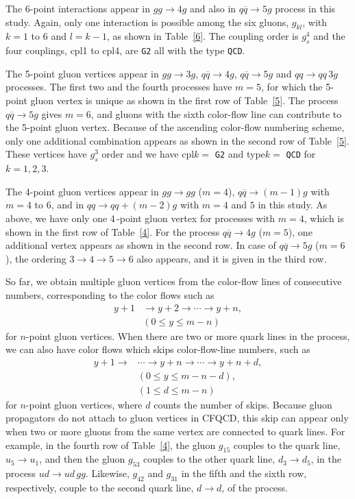 \documentclass[a4paper,11pt]{article}
\begin{document}
The 6-point interactions appear in $gg\rightarrow 4g$ and also in
$q\overline{q}\rightarrow 5g$ process in this study. Again, only one
interaction is possible among the six gluons, $g_{kl}$, with $k=1$ to
$6$ and $l=k-1$, as shown in Table~\ref{6}. The coupling order is
$g_s^4$ and the four couplings, cpl1 to cpl4, are {\tt G2} all with the type
{\tt QCD}.

The 5-point gluon vertices appear in $gg\rightarrow 3g$,
$q\overline{q}\rightarrow 4g$, $q\overline{q}\rightarrow 5g$ and $qq\rightarrow
qq\,3g$ processes. The first two and the fourth processes have $m=5$, for which
the 5-point gluon vertex is unique as shown in the first row of
Table~\ref{5}. The process $q\overline{q}\rightarrow 5g$ gives $m=6$,
and gluons with the sixth color-flow line can contribute to the 5-point gluon
vertex. Because of the ascending color-flow numbering scheme, only one
additional combination appears as shown in the second row of
Table~\ref{5}. These vertices have $g_s^3$ order and we have cpl$k=$ {\tt G2}
and type$k=$ {\tt QCD} for $k=1,2,3$.

The 4-point gluon vertices appear in $gg\rightarrow gg$
($m=4$), $q\overline{q}\rightarrow (m-1)g$ with $m=4$ to $6$, and in
$qq\rightarrow qq+(m-2)g$ with $m=4$ and $5$ in this study. As above, we
have only one 4\,-point gluon vertex for processes with $m=4$, which is shown in
the first row of Table~\ref{4}. For the process $q\overline{q}\rightarrow
4g$ ($m=5$), one additional vertex appears as shown in the second
row. In case of $q\overline{q}\rightarrow 5g$ ($m=6$), the ordering
$3\rightarrow 4\rightarrow 5\rightarrow 6$ also appears, and it is given
in the third row.

So far, we obtain multiple gluon vertices from the color-flow lines of consecutive numbers, corresponding to the color flows
such as
\begin{align}
  y+1&\rightarrow y+2\rightarrow \cdots \rightarrow y+n,\nonumber\\
    &(0\leq y\leq m-n)
\end{align}
 for $n$-point gluon
vertices. When there are two or more quark lines in
the process, we can also have color flows which skips color-flow-line numbers, such as
\begin{align}
 y+1\rightarrow& \cdots \rightarrow y+n\rightarrow \cdots \rightarrow y+n+d,\nonumber\\
 &(0\leq y \leq m-n-d),\nonumber\\
  &(1 \leq d\leq m-n)
\end{align}
for $n$-point gluon vertices, where $d$ counts the number of
skips. Because gluon propagators do not attach to gluon vertices in CFQCD, this skip can appear only when
two or more gluons from the same vertex are connected to quark lines.
 For example, in the fourth row of Table~\ref{4},
the gluon $g_{15}$ couples to the quark line, $u_5\rightarrow u_1$,
and then
the gluon $g_{53}$ couples to the other quark line, $d_3\rightarrow d_5$, in the
process $ud\rightarrow ud\,gg$. Likewise, $g_{42}$ and $g_{31}$ in the
fifth and the sixth row, respectively, couple to the
second quark line, $d\rightarrow d$, of the process.
\end{document}
